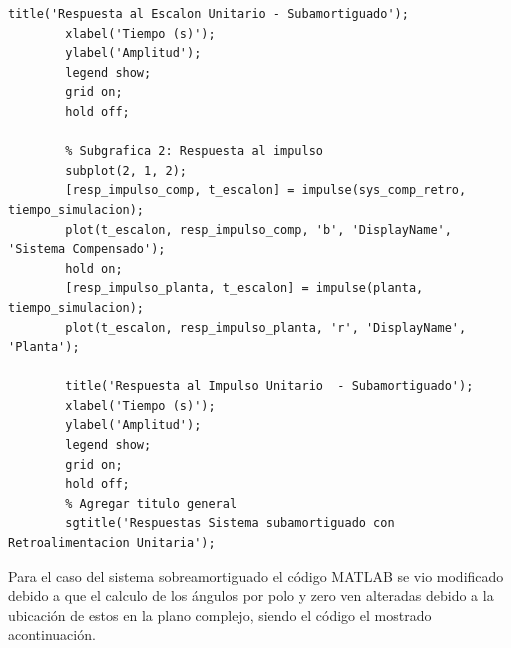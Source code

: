 \documentclass[conference]{IEEEtran}
\begin{document}
\begin{lstlisting}[numbers=none]
		title('Respuesta al Escalon Unitario - Subamortiguado');
		xlabel('Tiempo (s)');
		ylabel('Amplitud');
		legend show;
		grid on; 
		hold off;
		
		% Subgrafica 2: Respuesta al impulso 
		subplot(2, 1, 2); 
		[resp_impulso_comp, t_escalon] = impulse(sys_comp_retro, tiempo_simulacion);
		plot(t_escalon, resp_impulso_comp, 'b', 'DisplayName', 'Sistema Compensado');
		hold on;
		[resp_impulso_planta, t_escalon] = impulse(planta, tiempo_simulacion);
		plot(t_escalon, resp_impulso_planta, 'r', 'DisplayName', 'Planta');
		
		title('Respuesta al Impulso Unitario  - Subamortiguado');
		xlabel('Tiempo (s)');
		ylabel('Amplitud'); 
		legend show;
		grid on; 
		hold off;
		% Agregar titulo general 
		sgtitle('Respuestas Sistema subamortiguado con Retroalimentacion Unitaria');
	\end{lstlisting}
	Para el caso del sistema sobreamortiguado el código MATLAB se vio modificado debido a que el calculo de los ángulos por polo y zero ven alteradas debido a la ubicación de estos en la plano complejo, siendo el código el mostrado acontinuación.
	
\end{document}
